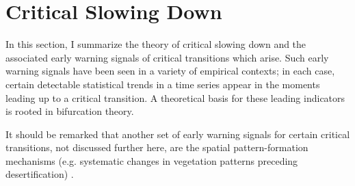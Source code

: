 \section{Critical Slowing Down}
\label{sec:csd}

In this section, I summarize the theory of critical slowing down and the associated early warning signals of critical transitions which arise. Such early warning signals have been seen in a variety of empirical contexts; in each case, certain detectable statistical trends in a time series appear in the moments leading up to a critical transition. A theoretical basis for these leading indicators is rooted in bifurcation theory. 

It should be remarked that another set of early warning signals for certain critical transitions, not discussed further here, are the spatial pattern-formation mechanisms (e.g. systematic changes in vegetation patterns preceding desertification) . 






